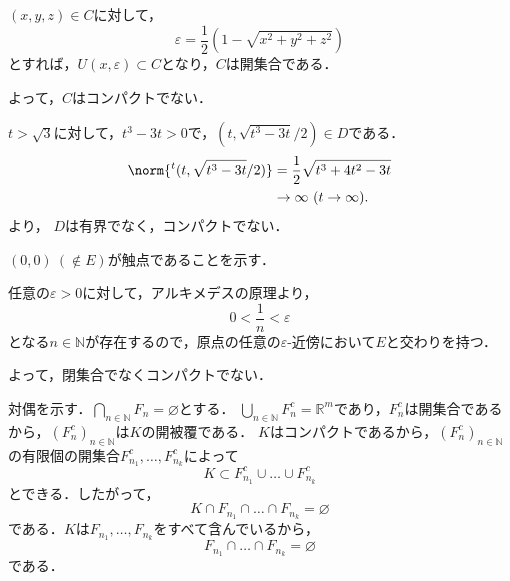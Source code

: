 
\begin{tanswer}
    $(x,y,z) \in C$に対して，
    \[
        \varepsilon =\frac{1}{2}(1-\sqrt{x^2+y^2+z^2})
    \]
    とすれば，$U(x,\varepsilon)\subset C$となり，$C$は開集合である．

    よって，$C$はコンパクトでない．
\end{tanswer}




\begin{tanswer}
    $t>\sqrt{3}$に対して，$t^3 -3t >0$で，$(t,\sqrt{t^3-3t}/2) \in D$である．
    \begin{align*}
        \norm{{}^t (t,\sqrt{t^3-3t}/2)} & = \frac{1}{2}\sqrt{t^3+4t^2-3t} \\
                                        & \to  \infty ~(t \to \infty).
    \end{align*}
    より， $D$は有界でなく，コンパクトでない．
\end{tanswer}



\begin{tanswer}
    $(0,0)~(\notin E)$が触点であることを示す．

    任意の$\varepsilon >0$に対して，アルキメデスの原理より，
    \[
        0 < \frac{1}{n} < \varepsilon
    \]
    となる$n \in \mathbb{N}$が存在するので，原点の任意の$\varepsilon$-近傍において$E$と交わりを持つ．

    よって，閉集合でなくコンパクトでない．
\end{tanswer}




\begin{tproof}
    対偶を示す．$\bigcap_{n \in \mathbb{N}}F_n = \varnothing$とする．
    $\bigcup_{n \in \mathbb{N}}F_n^c = \mathbb{R}^m$であり，$F_n^c$は開集合であるから，$(F_n^c)_{n \in \mathbb{N}}$は$K$の開被覆である．
    $K$はコンパクトであるから，$(F_n^c)_{n \in \mathbb{N}}$の有限個の開集合$F_{n_1}^c,\ldots,F_{n_k}^c$によって
    \[
        K \subset F_{n_1}^c \cup \ldots \cup F_{n_k}^c
    \]
    とできる．したがって，
    \[
        K \cap F_{n_1} \cap \ldots \cap F_{n_k} = \varnothing
    \]
    である．$K$は$F_{n_1},\ldots,F_{n_k}$をすべて含んでいるから，
    \[
        F_{n_1} \cap \ldots \cap F_{n_k} = \varnothing
    \]
    である．
\end{tproof}



